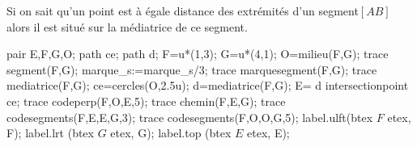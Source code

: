 \begin{changemargin}{0mm}{-15mm}
\begin{minipage}{0.7\linewidth}
    \begin{propriete}[\admise]
        Si on sait qu'un point est à égale distance des extrémités d'un segment$[AB]$ alors il est situé sur la médiatrice de ce segment.
    \end{propriete}
\end{minipage}
\begin{minipage}{0.25\linewidth}
    \begin{center}
        \begin{Geometrie}[CoinHD={(5u,5u)}]
            pair E,F,G,O;
            path ce;
            path d;
            F=u*(1,3);
            G=u*(4,1);
            O=milieu(F,G);
            trace segment(F,G);
            marque_s:=marque_s/3;
            trace marquesegment(F,G);
            trace mediatrice(F,G);
            ce=cercles(O,2.5u);
            d=mediatrice(F,G);
            E= d intersectionpoint ce;
            trace codeperp(F,O,E,5);
            trace chemin(F,E,G);
            trace codesegments(F,E,E,G,3);
            trace codesegments(F,O,O,G,5);
            label.ulft(btex $F$ etex, F);
            label.lrt (btex $G$ etex, G);
            label.top (btex $E$ etex, E);
        \end{Geometrie}
    \end{center}
\end{minipage}

\begin{remarque}


\end{remarque}
\end{changemargin}
